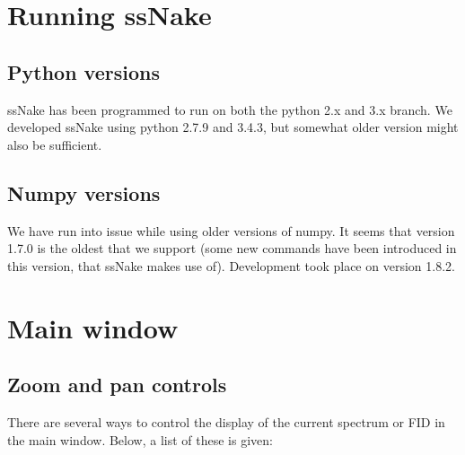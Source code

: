 \documentclass[11pt,a4paper]{article}
\renewcommand\cfttoctitlefont{\color{black!70}\Huge\fontfamily{SourceSansPro-LF}\bfseries}
\begin{document}


\thispagestyle{empty}
\newpage
\mbox{}


\renewcommand\cfttoctitlefont{\color{black}\Huge\fontfamily{SourceSansPro-LF}\bfseries}
\setcounter{tocdepth}{2}
\tableofcontents %

\renewcommand\cfttoctitlefont{\color{black!70}\Huge\fontfamily{SourceSansPro-LF}\bfseries}



\section{Running ssNake}
\subsection{Python versions}
ssNake has been programmed to run on both the python 2.x and 3.x branch. We developed ssNake using python 2.7.9 and 3.4.3, but somewhat older version might also be sufficient. 

\subsection{Numpy versions}
We have run into issue while using older versions of numpy. It seems that version 1.7.0 is the oldest that we support (some new commands have been introduced in this version, that ssNake makes use of). Development took place on version 1.8.2.


\section{Main window}
\subsection{Zoom and pan controls}
There are several ways to control the display of the current spectrum or FID in the main window. Below, a list of these is given:
\end{document}
